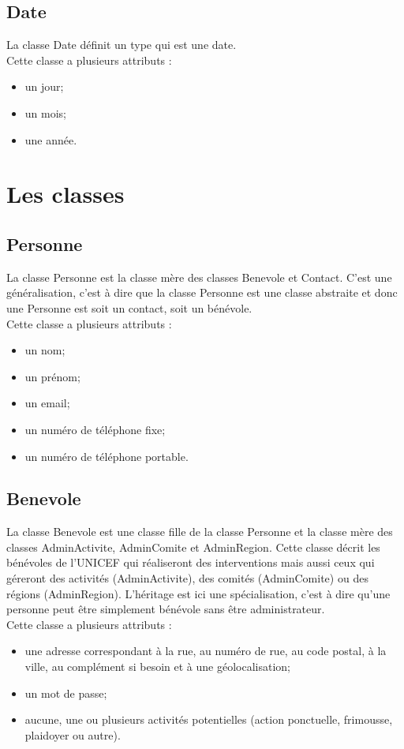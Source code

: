 \documentclass[asi, sansVersion]{picInsa}
\begin{document}
\subsection*{Date}

La classe Date définit un type qui est une date.\\
Cette classe a plusieurs attributs : 
\begin{itemize}
\item un jour;
\item un mois;
\item une année.
\end{itemize}


\section{Les classes}

\subsection*{Personne}

La classe Personne est la classe mère des classes Benevole et Contact. C'est une généralisation, c'est à dire que la classe Personne est une classe abstraite et donc une Personne est soit un contact, soit un bénévole. \\
Cette classe a plusieurs attributs : 
\begin{itemize}
\item un nom;
\item un prénom;
\item un email;
\item un numéro de téléphone fixe;
\item un numéro de téléphone portable.
\end{itemize}

\subsection*{Benevole}

La classe Benevole est une classe fille de la classe Personne et la classe mère des classes AdminActivite, AdminComite et AdminRegion. Cette classe décrit les bénévoles de l'UNICEF qui réaliseront des interventions mais aussi ceux qui géreront des activités (AdminActivite), des comités (AdminComite) ou des régions (AdminRegion). L'héritage est ici une spécialisation, c'est à dire qu'une personne peut être simplement bénévole sans être administrateur. \\
Cette classe a plusieurs attributs : 
\begin{itemize}
\item une adresse correspondant à la rue, au numéro de rue, au code postal, à la ville, au complément si besoin et à une géolocalisation;
\item un mot de passe;
\item aucune, une ou plusieurs activités potentielles (action ponctuelle, frimousse, plaidoyer ou autre).
\end{itemize}
\end{document}
